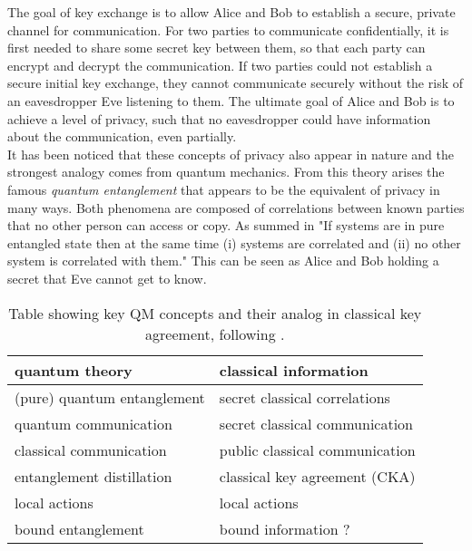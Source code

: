 

The goal of key exchange is to allow Alice and Bob to establish a secure, private channel for communication.
For two parties to communicate confidentially, it is first needed to share some secret key between them, so that each party can encrypt and decrypt the communication.
If two parties could not establish a secure initial key exchange, they cannot communicate securely without the risk of an eavesdropper Eve listening to them.
The ultimate goal of Alice and Bob is to achieve a level of privacy, such that no eavesdropper could have information about the communication, even partially.\\

It has been noticed that these concepts of privacy also appear in nature and the strongest analogy comes from quantum mechanics.\footnotemark 
From this theory arises the famous \emph{quantum entanglement} that appears to be the equivalent of privacy in many ways.
Both phenomena are composed of correlations between known parties that no other person can access or copy. As summed in \cite{4H07} "If systems are in pure entangled state then at the same time (i) systems are correlated and (ii) no other system is correlated with them."
This can be seen as Alice and Bob holding a secret that Eve cannot get to know.
\begin{table}[h]
	 \centering
	 	\begin{tabular}{ l | l}
	 		\textbf{quantum theory} & \textbf{classical information} \\ 
	 		\hline 
	 		(pure) quantum entanglement & secret classical correlations \\ 
	 		quantum communication & secret classical communication \\ 
	 		classical communication & public classical communication \\ 
	 		entanglement distillation & classical key agreement (CKA) \\ 
	 		local actions & local actions \\ 
	 		bound entanglement & bound information ? \\
	 	\end{tabular} 
	 	\caption{Table showing key QM concepts and their analog in classical key agreement, following \cite{CP02}.
	 	\label{Tab:analogy}}
	 \end{table}
\\

